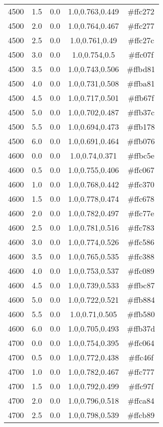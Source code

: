 \begin{tabular}{ccccc}
4500 & 1.5 & 0.0 & 1.0,0.763,0.449 & \#ffc272 \\ 
4500 & 2.0 & 0.0 & 1.0,0.764,0.467 & \#ffc277 \\ 
4500 & 2.5 & 0.0 & 1.0,0.761,0.49 & \#ffc27c \\ 
4500 & 3.0 & 0.0 & 1.0,0.754,0.5 & \#ffc07f \\ 
4500 & 3.5 & 0.0 & 1.0,0.743,0.506 & \#ffbd81 \\ 
4500 & 4.0 & 0.0 & 1.0,0.731,0.508 & \#ffba81 \\ 
4500 & 4.5 & 0.0 & 1.0,0.717,0.501 & \#ffb67f \\ 
4500 & 5.0 & 0.0 & 1.0,0.702,0.487 & \#ffb37c \\ 
4500 & 5.5 & 0.0 & 1.0,0.694,0.473 & \#ffb178 \\ 
4500 & 6.0 & 0.0 & 1.0,0.691,0.464 & \#ffb076 \\ 
4600 & 0.0 & 0.0 & 1.0,0.74,0.371 & \#ffbc5e \\ 
4600 & 0.5 & 0.0 & 1.0,0.755,0.406 & \#ffc067 \\ 
4600 & 1.0 & 0.0 & 1.0,0.768,0.442 & \#ffc370 \\ 
4600 & 1.5 & 0.0 & 1.0,0.778,0.474 & \#ffc678 \\ 
4600 & 2.0 & 0.0 & 1.0,0.782,0.497 & \#ffc77e \\ 
4600 & 2.5 & 0.0 & 1.0,0.781,0.516 & \#ffc783 \\ 
4600 & 3.0 & 0.0 & 1.0,0.774,0.526 & \#ffc586 \\ 
4600 & 3.5 & 0.0 & 1.0,0.765,0.535 & \#ffc388 \\ 
4600 & 4.0 & 0.0 & 1.0,0.753,0.537 & \#ffc089 \\ 
4600 & 4.5 & 0.0 & 1.0,0.739,0.533 & \#ffbc87 \\ 
4600 & 5.0 & 0.0 & 1.0,0.722,0.521 & \#ffb884 \\ 
4600 & 5.5 & 0.0 & 1.0,0.71,0.505 & \#ffb580 \\ 
4600 & 6.0 & 0.0 & 1.0,0.705,0.493 & \#ffb37d \\ 
4700 & 0.0 & 0.0 & 1.0,0.754,0.395 & \#ffc064 \\ 
4700 & 0.5 & 0.0 & 1.0,0.772,0.438 & \#ffc46f \\ 
4700 & 1.0 & 0.0 & 1.0,0.782,0.467 & \#ffc777 \\ 
4700 & 1.5 & 0.0 & 1.0,0.792,0.499 & \#ffc97f \\ 
4700 & 2.0 & 0.0 & 1.0,0.796,0.518 & \#ffca84 \\ 
4700 & 2.5 & 0.0 & 1.0,0.798,0.539 & \#ffcb89 \\ 

\end{tabular}
